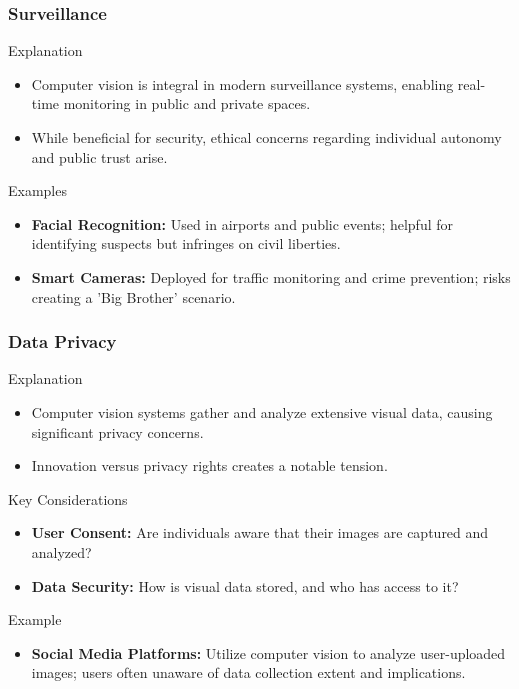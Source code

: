 \documentclass[aspectratio=169]{beamer}
\begin{document}
\begin{frame}[fragile]
    \frametitle{Surveillance}
    \begin{block}{Explanation}
        \begin{itemize}
            \item Computer vision is integral in modern surveillance systems, enabling real-time monitoring in public and private spaces.
            \item While beneficial for security, ethical concerns regarding individual autonomy and public trust arise.
        \end{itemize}
    \end{block}
    
    \begin{block}{Examples}
        \begin{itemize}
            \item \textbf{Facial Recognition:} Used in airports and public events; helpful for identifying suspects but infringes on civil liberties.
            \item \textbf{Smart Cameras:} Deployed for traffic monitoring and crime prevention; risks creating a 'Big Brother' scenario.
        \end{itemize}
    \end{block}
\end{frame}

\begin{frame}[fragile]
    \frametitle{Data Privacy}
    \begin{block}{Explanation}
        \begin{itemize}
            \item Computer vision systems gather and analyze extensive visual data, causing significant privacy concerns.
            \item Innovation versus privacy rights creates a notable tension.
        \end{itemize}
    \end{block}
    
    \begin{block}{Key Considerations}
        \begin{itemize}
            \item \textbf{User Consent:} Are individuals aware that their images are captured and analyzed?
            \item \textbf{Data Security:} How is visual data stored, and who has access to it?
        \end{itemize}
    \end{block}

    \begin{block}{Example}
        \begin{itemize}
            \item \textbf{Social Media Platforms:} Utilize computer vision to analyze user-uploaded images; users often unaware of data collection extent and implications.
        \end{itemize}
    \end{block}
\end{frame}
\end{document}
